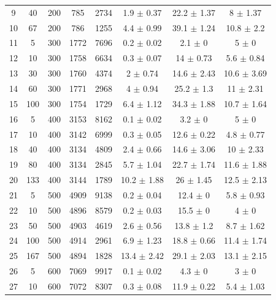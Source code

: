 \documentclass[11pt]{article}
\begin{document}
\begin{table}[]
{\begin{tabular}{cccccccc}
				9 & 40 & 200 & 785 & 2734 & 1.9 $\pm$ 0.37 & 22.2 $\pm$ 1.37 & 8 $\pm$ 1.37 \\
				10 & 67 & 200 & 786 & 1255 & 4.4 $\pm$ 0.99 & 39.1 $\pm$ 1.24 & 10.8 $\pm$ 2.2 \\
				\rowcolor[HTML]{EFEFEF} 
				11 & 5 & 300 & 1772 & 7696 & 0.2 $\pm$ 0.02 & 2.1 $\pm$ 0 & 5 $\pm$ 0 \\
				\rowcolor[HTML]{EFEFEF} 
				12 & 10 & 300 & 1758 & 6634 & 0.3 $\pm$ 0.07 & 14 $\pm$ 0.73 & 5.6 $\pm$ 0.84 \\
				\rowcolor[HTML]{EFEFEF} 
				13 & 30 & 300 & 1760 & 4374 & 2 $\pm$ 0.74 & 14.6 $\pm$ 2.43 & 10.6 $\pm$ 3.69 \\
				\rowcolor[HTML]{EFEFEF} 
				14 & 60 & 300 & 1771 & 2968 & 4 $\pm$ 0.94 & 25.2 $\pm$ 1.3 & 11 $\pm$ 2.31 \\
				\rowcolor[HTML]{EFEFEF} 
				15 & 100 & 300 & 1754 & 1729 & 6.4 $\pm$ 1.12 & 34.3 $\pm$ 1.88 & 10.7 $\pm$ 1.64 \\
				16 & 5 & 400 & 3153 & 8162 & 0.1 $\pm$ 0.02 & 3.2 $\pm$ 0 & 5 $\pm$ 0 \\
				17 & 10 & 400 & 3142 & 6999 & 0.3 $\pm$ 0.05 & 12.6 $\pm$ 0.22 & 4.8 $\pm$ 0.77 \\
				18 & 40 & 400 & 3134 & 4809 & 2.4 $\pm$ 0.66 & 14.6 $\pm$ 3.06 & 10 $\pm$ 2.33 \\
				19 & 80 & 400 & 3134 & 2845 & 5.7 $\pm$ 1.04 & 22.7 $\pm$ 1.74 & 11.6 $\pm$ 1.88 \\
				20 & 133 & 400 & 3144 & 1789 & 10.2 $\pm$ 1.88 & 26 $\pm$ 1.45 & 12.5 $\pm$ 2.13 \\
				\rowcolor[HTML]{EFEFEF} 
				21 & 5 & 500 & 4909 & 9138 & 0.2 $\pm$ 0.04 & 12.4 $\pm$ 0 & 5.8 $\pm$ 0.93 \\
				\rowcolor[HTML]{EFEFEF} 
				22 & 10 & 500 & 4896 & 8579 & 0.2 $\pm$ 0.03 & 15.5 $\pm$ 0 & 4 $\pm$ 0 \\
				\rowcolor[HTML]{EFEFEF} 
				23 & 50 & 500 & 4903 & 4619 & 2.6 $\pm$ 0.56 & 13.8 $\pm$ 1.2 & 8.7 $\pm$ 1.62 \\
				\rowcolor[HTML]{EFEFEF} 
				24 & 100 & 500 & 4914 & 2961 & 6.9 $\pm$ 1.23 & 18.8 $\pm$ 0.66 & 11.4 $\pm$ 1.74 \\
				\rowcolor[HTML]{EFEFEF} 
				25 & 167 & 500 & 4894 & 1828 & 13.4 $\pm$ 2.42 & 29.1 $\pm$ 2.03 & 13.1 $\pm$ 2.15 \\
				26 & 5 & 600 & 7069 & 9917 & 0.1 $\pm$ 0.02 & 4.3 $\pm$ 0 & 3 $\pm$ 0 \\
				27 & 10 & 600 & 7072 & 8307 & 0.3 $\pm$ 0.08 & 11.9 $\pm$ 0.22 & 5.4 $\pm$ 1.03 \\

\end{tabular}}
\end{table}
\end{document}
